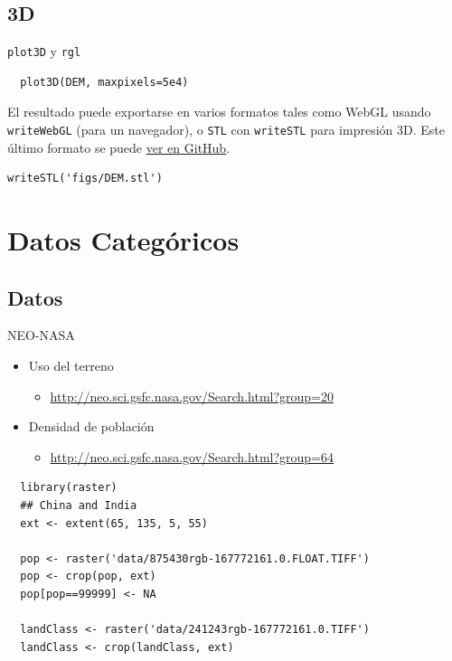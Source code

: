 \documentclass[xcolor={usenames,svgnames,dvipsnames}]{beamer}
\begin{document}
\subsection{3D}
\label{sec-2-4}

\begin{frame}[fragile,label=sec-2-4-1]{\texttt{plot3D} y \texttt{rgl}}
 \lstset{language=R,label= ,caption= ,numbers=none}
\begin{lstlisting}
  plot3D(DEM, maxpixels=5e4)
\end{lstlisting}

\begin{block}{}
El resultado puede exportarse en varios formatos tales como WebGL
usando \texttt{writeWebGL} (para un navegador), o \texttt{STL} con \texttt{writeSTL} para
impresión 3D. Este último formato se puede \href{https://github.com/oscarperpinan/spacetime-vis/blob/gh-pages/images/DEM.stl}{ver en GitHub}.

\lstset{language=R,label= ,caption= ,numbers=none}
\begin{lstlisting}
writeSTL('figs/DEM.stl')
\end{lstlisting}
\end{block}
\end{frame}

\section{Datos Categóricos}
\label{sec-3}

\subsection{Datos}
\label{sec-3-1}

\begin{frame}[fragile,label=sec-3-1-1]{NEO-NASA}
 \begin{itemize}
\item Uso del terreno
\begin{itemize}
\item \url{http://neo.sci.gsfc.nasa.gov/Search.html?group=20}
\end{itemize}
\item Densidad de población
\begin{itemize}
\item \url{http://neo.sci.gsfc.nasa.gov/Search.html?group=64}
\end{itemize}
\end{itemize}
\lstset{language=R,label= ,caption= ,numbers=none}
\begin{lstlisting}
  library(raster)
  ## China and India  
  ext <- extent(65, 135, 5, 55)
  
  pop <- raster('data/875430rgb-167772161.0.FLOAT.TIFF')
  pop <- crop(pop, ext)
  pop[pop==99999] <- NA
  
  landClass <- raster('data/241243rgb-167772161.0.TIFF')
  landClass <- crop(landClass, ext)
\end{lstlisting}
\end{frame}
\end{document}
